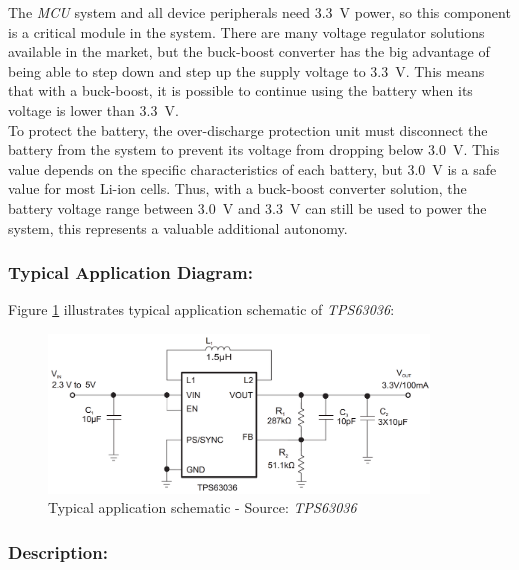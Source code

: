 \documentclass[report.tex]{subfiles}
\begin{document}
The \textit{MCU} system and all device peripherals need \SI{3.3}{\volt} power, so this component is a critical module in the system. There are many voltage regulator solutions available in the market, but the buck-boost converter has the big advantage of being able to step down and step up the supply voltage to \SI{3.3}{\volt}. This means that with a buck-boost, it is possible to continue using the battery when its voltage is lower than \SI{3.3}{\volt}.\\

To protect the battery, the over-discharge protection unit must disconnect the battery from the system to prevent its voltage from dropping below \SI{3.0}{\volt}. This value depends on the specific characteristics of each battery, but \SI{3.0}{\volt} is a safe value for most Li-ion cells. Thus, with a buck-boost converter solution, the battery voltage range between \SI{3.0}{\volt} and \SI{3.3}{\volt} can still be used to power the system, this represents a valuable additional autonomy.

\subsubsection{Typical Application Diagram:}

Figure \ref{fig:tps63036_simplified_schematic} illustrates typical application schematic of \textit{TPS63036}:

\begin{figure}[H]
	\centering
	\includegraphics[width=0.9\textwidth]{Include/Figure/comp/tps63036_simplified_schematic.png}
	\caption{Typical application schematic - Source: \textit{TPS63036}\cite{TPS63036}}
	\label{fig:tps63036_simplified_schematic}
\end{figure}

\pagebreak

\subsubsection{Description:}
\end{document}
